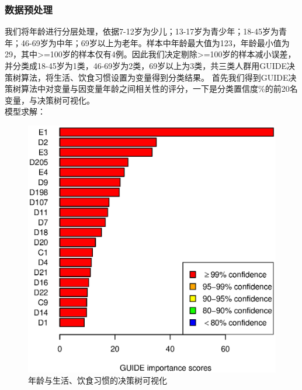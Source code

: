 \documentclass{article}
\begin{document}
\begin{CJK}{UTF8}{gbsn}
        \subsubsection{数据预处理}
我们将年龄进行分层处理，依据7-12岁为少儿；13-17岁为青少年；18-45岁为青年；46-69岁为中年；69岁以上为老年。样本中年龄最大值为123，年龄最小值为29，其中>=100岁的样本仅有4例。因此我们决定剔除>=100岁的样本减小误差，并分类成18-45岁为1类，46-69岁为2类，69岁以上为3类，共三类人群用GUIDE决策树算法，将生活、饮食习惯设置为变量得到分类结果。
首先我们得到GUIDE决策树算法中对变量与因变量年龄之间相关性的评分，一下是分类置信度\%的前20名变量，与决策树可视化。
\\
模型求解：
\begin{figure}[htbp]
    \flushleft
    \includegraphics[scale=0.6]{A2_imp.eps}
    \caption{年龄与生活、饮食习惯的决策树可视化}
    \label{}
\end{figure}
\begin{figure}[htbp]
    \flushleft

\end{figure}
\end{CJK}
\end{document}

